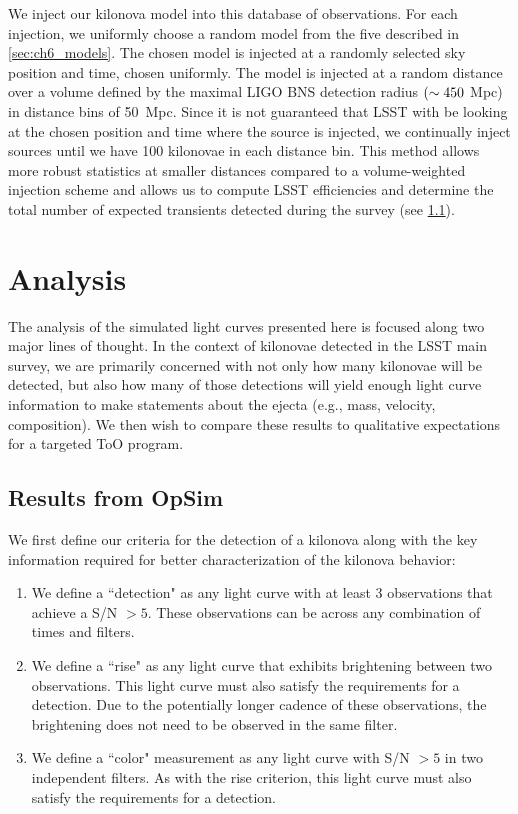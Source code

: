 We inject our kilonova model into this database of observations. For each injection, we uniformly choose a random model from the five described in \cref{sec:ch6_models}. The chosen model is injected at a randomly selected sky position and time, chosen uniformly. The model is injected at a random  
distance over a volume defined by the maximal LIGO BNS detection radius $(\sim450$ Mpc) in distance bins of 50~Mpc. Since it is not guaranteed that LSST with be looking at the chosen position and time where the source is injected, we continually inject sources until we have 100 kilonovae in each distance bin. This method allows more robust statistics at smaller distances compared to a volume-weighted injection scheme and allows us to compute LSST efficiencies and determine the total number of expected transients detected during the survey (see \cref{sec:ch6_opsim_results}).

\section{Analysis}
\label{sec:ch6_analysis}
The analysis of the simulated light curves presented here is focused along two major lines of thought. In the context of kilonovae detected in the LSST main survey, we are primarily concerned with not only how many kilonovae will be detected, but also how many of those detections will yield enough light curve information to make statements about the ejecta (e.g., mass, velocity, composition). We then wish to compare these results to qualitative expectations for a targeted ToO program.

\subsection{Results from OpSim}
\label{sec:ch6_opsim_results}
We first define our criteria for the detection of a kilonova along with the key information required for better characterization of the kilonova behavior:
\begin{enumerate}
\item We define a ``detection" as any light curve with at least 3 observations that achieve a S/N $> 5$. These observations can be across any combination of times and filters.
\item We define a ``rise" as any light curve that exhibits brightening between two observations. This light curve must also satisfy the requirements for a detection. Due to the potentially longer cadence of these observations, the brightening does not need to be observed in the same filter.
\item We define a ``color" measurement as any light curve with S/N $> 5$ in two independent filters. As with the rise criterion, this light curve must also satisfy the requirements for a detection.
\end{enumerate}

